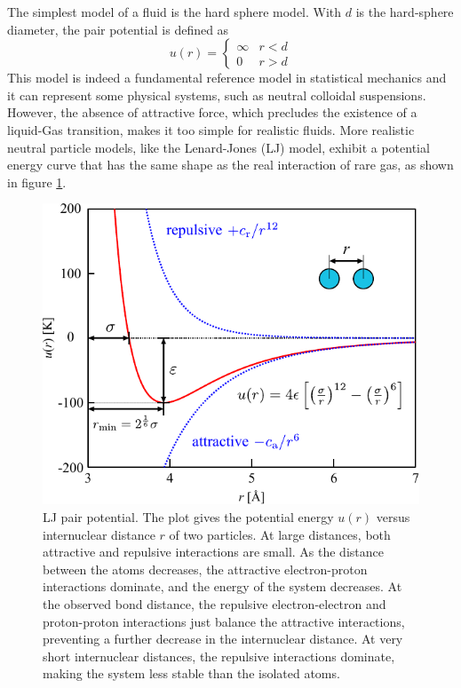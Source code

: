 The simplest model of a fluid is the hard sphere model. With $d$
is the hard-sphere diameter, the pair potential is defined as
\begin{equation}
u(r)=\begin{cases}
\infty & r<d\\
0 & r>d
\end{cases}
\end{equation}
This model is indeed a fundamental reference model in statistical
mechanics and it can represent some physical systems, such as neutral
colloidal suspensions. However, the absence of attractive force, which
precludes the existence of a liquid-Gas transition, makes it too simple
for realistic fluids. More realistic neutral particle models, like
the Lenard-Jones (LJ) model, exhibit a potential energy curve that
has the same shape as the real interaction of rare gas, as shown in
figure \ref{fig:LJ-pair-potential}.

\begin{figure}[h]
\begin{centering}
\includegraphics[scale=0.82]{_figure/lj-centre}
\par\end{centering}
\caption[LJ pair potential]{LJ pair potential. The plot gives the potential energy $u(r)$ versus
internuclear distance $r$ of two particles. At large distances, both
attractive and repulsive interactions are small. As the distance between
the atoms decreases, the attractive electron-proton interactions dominate,
and the energy of the system decreases. At the observed bond distance,
the repulsive electron-electron and proton-proton interactions just
balance the attractive interactions, preventing a further decrease
in the internuclear distance. At very short internuclear distances,
the repulsive interactions dominate, making the system less stable
than the isolated atoms.\label{fig:LJ-pair-potential}}
\end{figure}

